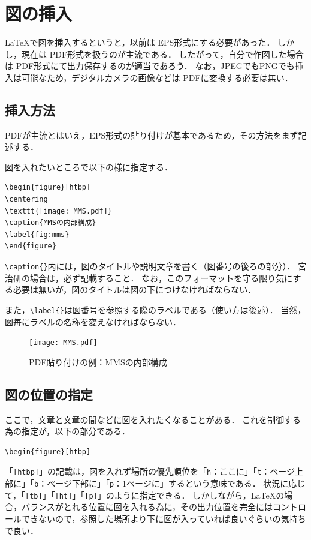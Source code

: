 \section{図の挿入}
\LaTeX で図を挿入するというと，以前は EPS形式にする必要があった．
しかし，現在は PDF形式を扱うのが主流である．
したがって，自分で作図した場合は PDF形式にて出力保存するのが適当であろう．
なお，JPEGでもPNGでも挿入は可能なため，デジタルカメラの画像などは PDFに変換する必要は無い．

\subsection{挿入方法}
PDFが主流とはいえ，EPS形式の貼り付けが基本であるため，その方法をまず記述する．

図を入れたいところで以下の様に指定する．
\begin{breakbox}
{\small
\begin{verbatim}
\begin{figure}[htbp]
\centering
\texttt{[image: MMS.pdf]}
\caption{MMSの内部構成}
\label{fig:mms}
\end{figure}
\end{verbatim}
}
\end{breakbox}

\verb+\caption{}+内には，図のタイトルや説明文章を書く（図番号の後ろの部分）．
宮治研の場合は，必ず記載すること．
なお，このフォーマットを守る限り気にする必要は無いが，図のタイトルは図の下につけなければならない．

また，\verb+\label{}+は図番号を参照する際のラベルである（使い方は後述）．
当然，図毎にラベルの名称を変えなければならない．

\begin{figure}[htb]
\centering
\texttt{[image: MMS.pdf]}
\caption{PDF貼り付けの例：MMSの内部構成}
\label{fig:mms}
\end{figure}

\subsection{図の位置の指定}
ここで，文章と文章の間などに図を入れたくなることがある．
これを制御する為の指定が，以下の部分である．
\begin{breakbox}
{\small
\begin{verbatim}
\begin{figure}[htbp]
\end{verbatim}
}
\end{breakbox}
「\verb+[htbp]+」の記載は，図を入れず場所の優先順位を「\verb+h+：ここに」「\verb+t+：ページ上部に」「\verb+b+：ページ下部に」「\verb+p+：1ページに」するという意味である．
状況に応じて，「\verb+[tb]+」「\verb+[ht]+」「\verb+[p]+」のように指定できる．
しかしながら，\LaTeX の場合，バランスがとれる位置に図を入れる為に，その出力位置を完全にはコントロールできないので，参照した場所より下に図が入っていれば良いぐらいの気持ちで良い．

